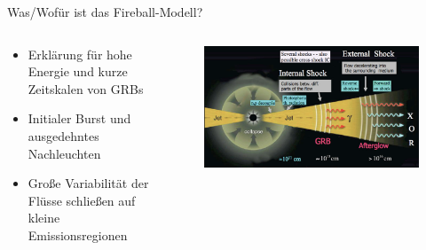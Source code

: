   \begin{frame}{Was/Wofür ist das Fireball-Modell?}
    \begin{columns}
   \begin{column}{0.5\textwidth}
    \begin{itemize}
      \setlength\itemsep{2em}
      \item Erklärung für hohe Energie und kurze Zeitskalen von GRBs
      \item Initialer Burst und ausgedehntes Nachleuchten
      \item Große Variabilität der Flüsse schließen auf kleine Emissionsregionen
     \end{itemize}
  \vspace{2em}
  \end{column}
  \begin{column}{0.5\textwidth}
  \begin{figure}
    \centering
    \includegraphics[width=\textwidth]{images/fireball.png}
  \end{figure}
  \end{column}
    \end{columns}
  \end{frame}

